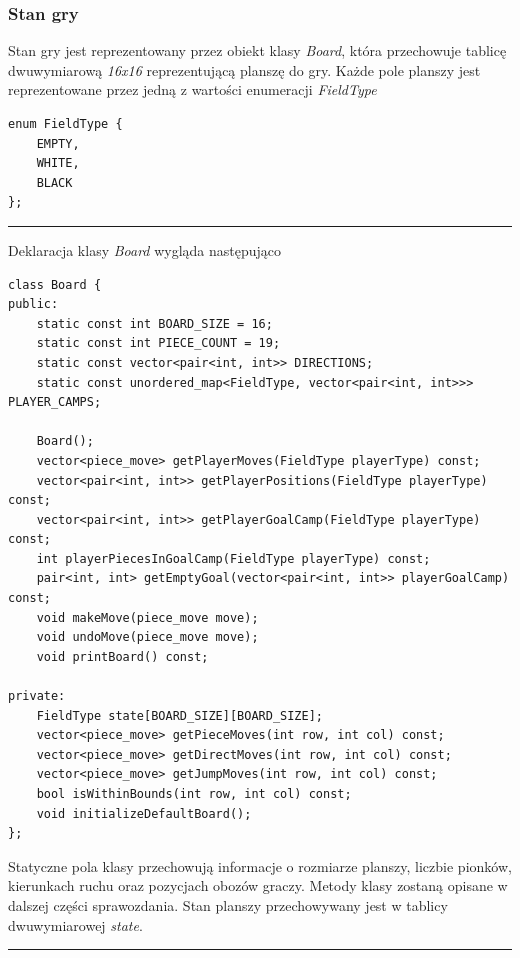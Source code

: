 \documentclass[a4paper, 12pt]{article}
\begin{document}
\subsubsection{Stan gry}
Stan gry jest reprezentowany przez obiekt klasy \textit{Board},
która przechowuje tablicę dwuwymiarową \textit{16x16} reprezentującą planszę do gry.
Każde pole planszy jest reprezentowane przez jedną z wartości 
enumeracji \textit{FieldType}
\begin{lstlisting}
enum FieldType {
	EMPTY,
	WHITE,
	BLACK
};
\end{lstlisting}
\vspace{0.5cm}
\hrule
\vspace{1cm}


Deklaracja klasy \textit{Board} wygląda następująco
\begin{lstlisting}
class Board {
public:
    static const int BOARD_SIZE = 16;
    static const int PIECE_COUNT = 19;
    static const vector<pair<int, int>> DIRECTIONS;
    static const unordered_map<FieldType, vector<pair<int, int>>> PLAYER_CAMPS;

    Board();
    vector<piece_move> getPlayerMoves(FieldType playerType) const;
    vector<pair<int, int>> getPlayerPositions(FieldType playerType) const;
    vector<pair<int, int>> getPlayerGoalCamp(FieldType playerType) const;
    int playerPiecesInGoalCamp(FieldType playerType) const;
    pair<int, int> getEmptyGoal(vector<pair<int, int>> playerGoalCamp) const;
    void makeMove(piece_move move);
    void undoMove(piece_move move);
    void printBoard() const;

private:
    FieldType state[BOARD_SIZE][BOARD_SIZE];
    vector<piece_move> getPieceMoves(int row, int col) const;
    vector<piece_move> getDirectMoves(int row, int col) const;
    vector<piece_move> getJumpMoves(int row, int col) const;
    bool isWithinBounds(int row, int col) const;
    void initializeDefaultBoard();
};
\end{lstlisting}
Statyczne pola klasy przechowują informacje o 
rozmiarze planszy, liczbie pionków, kierunkach ruchu oraz
pozycjach obozów graczy. Metody klasy zostaną opisane w dalszej
części sprawozdania. 
Stan planszy przechowywany jest w tablicy dwuwymiarowej \textit{state}.
\vspace{0.5cm}
\hrule
\vspace{1cm}
\end{document}

